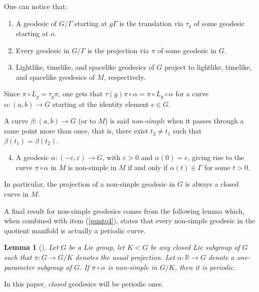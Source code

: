 \documentclass[12pt]{amsart}
\theoremstyle{plain}
\newtheorem{lem}[thm]{Lemma}
\theoremstyle{definition}
\theoremstyle{remark}
\begin{document}
One can notice that:

\begin{enumerate}
    \item A geodesic of \( G/\Gamma \) starting at \( g\Gamma \) is the translation via \( \tau_g \) of some geodesic starting at \( o \). \label{punto1}
    \item Every geodesic in \( G/\Gamma \) is the projection via \( \pi \) of some geodesic in \( G \). \label{punto2}
    \item Lightlike, timelike, and spacelike geodesics of \( G \) project to lightlike, timelike, and spacelike geodesics of \( M \), respectively.
\end{enumerate}

Since \( \pi \circ L_g = \tau_g \pi \), one gets that \( \tau(g)\pi \circ \alpha = \pi \circ L_g \circ \alpha \) for a curve \( \alpha: (a,b) \to G \) starting at the identity element \( e \in G \).

A curve $\beta:(a,b)\to G$ (or to $M$) is said {\em non-simple } when it passes through a same point more than once, that is, there exist $t_2\neq  t_1$ such that $\beta(t_1)=\beta(t_2)$.
\begin{enumerate}
    \setcounter{enumi}{3}
    \item A geodesic \( \alpha: (-\varepsilon, \varepsilon) \to G \), with \( \varepsilon > 0 \) and \( \alpha(0) = e \), giving rise to the curve \( \pi \circ \alpha \) in \( M \) is non-simple in \( M \) if and only if \( \alpha(t) \in \Gamma \) for some \( t > 0 \). \label{punto4}
\end{enumerate}

In particular, the projection of a non-simple geodesic in \( G \) is always a closed curve in \( M \).

A final result for non-simple geodesics comes from the following lemma which, when combined with item (\ref{punto4}), states that every non-simple geodesic in the quotient manifold is actually a periodic curve.

\begin{lem}[\cite{BOV}]
    Let \( G \) be a Lie group, let \( K < G \) be any closed Lie subgroup of \( G \) such that \( \pi: G \to G/K \) denotes the usual projection. Let \( \alpha: \mathbb{R} \to G \) denote a one-parameter subgroup of \( G \). If \( \pi \circ \alpha \) is non-simple in \( G/K \), then it is periodic.
\end{lem}

In this paper, \textit{closed} geodesics will be periodic ones.
\end{document}
